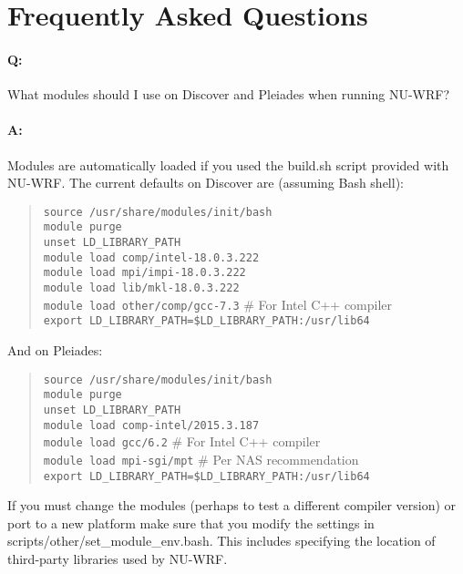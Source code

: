 \section{Frequently Asked Questions}
\label{sec:FAQ}

\paragraph{Q:} What modules should I use on Discover and Pleiades when running
NU-WRF?

\paragraph{A:} Modules are automatically loaded if you used the build.sh script provided with NU-WRF. The current defaults on Discover are (assuming Bash shell):

\begin{quote}
\texttt{source /usr/share/modules/init/bash} \\
\texttt{module purge} \\
\texttt{unset LD\_LIBRARY\_PATH} \\
\texttt{module load comp/intel-18.0.3.222} \\
\texttt{module load mpi/impi-18.0.3.222} \\
\texttt{module load lib/mkl-18.0.3.222} \\
\texttt{module load other/comp/gcc-7.3} \# For Intel C++ compiler \\
\texttt{export LD\_LIBRARY\_PATH=\$LD\_LIBRARY\_PATH:/usr/lib64} \\
\end{quote}

And on Pleiades:

\begin{quote}
\texttt{source /usr/share/modules/init/bash} \\
\texttt{module purge} \\
\texttt{unset LD\_LIBRARY\_PATH} \\
\texttt{module load comp-intel/2015.3.187} \\
\texttt{module load gcc/6.2} \# For Intel C++ compiler \\
\texttt{module load mpi-sgi/mpt} \# Per NAS recommendation \\
\texttt{export LD\_LIBRARY\_PATH=\$LD\_LIBRARY\_PATH:/usr/lib64} \\
\end{quote}

If you must change the modules (perhaps to test a different compiler version) or port to a new platform make sure that you modify the settings in scripts/other/set\_module\_env.bash. This includes specifying the location of third-party libraries used by NU-WRF.

